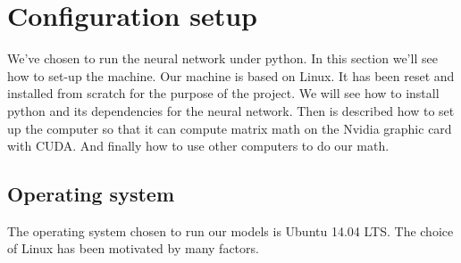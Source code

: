 










\section{Configuration setup}
	
	We've chosen to run the neural network under python. In this section we'll see how to set-up the machine. Our machine is based on Linux. It has been reset and installed from scratch for the purpose of the project. We will see how to install python and its dependencies for the neural network. Then is described how to set up the computer so that it can compute matrix math on the Nvidia graphic card with CUDA. And finally how to use other computers to do our math.


	\subsection{Operating system}
		The operating system chosen to run our models is Ubuntu 14.04 LTS. The choice of Linux has been motivated by many factors. 

